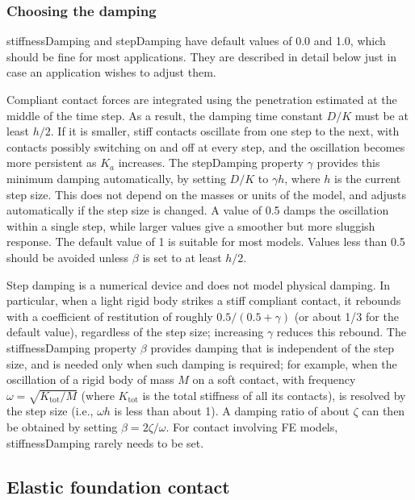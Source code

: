 \subsubsection{Choosing the damping}
\label{AreaCompliantContactDamping:sec}

{\sf stiffnessDamping} and {\sf stepDamping} have default values of 0.0 and
1.0, which should be fine for most applications. They are described in detail
below just in case an application wishes to adjust them.

Compliant contact forces are integrated using the penetration
estimated at the middle of the time step. As a result, the damping
time constant $D/K$ must be at least $h/2$. If it is smaller, stiff
contacts oscillate from one step to the next, with contacts possibly
switching on and off at every step, and the oscillation becomes more
persistent as $K_a$ increases. The {\sf stepDamping} property $\gamma$
provides this minimum damping automatically, by setting $D/K$ to
$\gamma h$, where $h$ is the current step size. This does not depend
on the masses or units of the model, and adjusts automatically if the
step size is changed. A value of 0.5 damps the oscillation within a
single step, while larger values give a smoother but more sluggish
response. The default value of 1 is suitable for most models. Values
less than 0.5 should be avoided unless $\beta$ is set to at least
$h/2$.

Step damping is a numerical device and does not model physical
damping. In particular, when a light rigid body strikes a stiff
compliant contact, it rebounds with a coefficient of restitution of
roughly $0.5/(0.5+\gamma)$ (or about 1/3 for the default value),
regardless of the step size; increasing $\gamma$ reduces this
rebound. The {\sf stiffnessDamping} property $\beta$ provides damping
that is independent of the step size, and is needed only when such
damping is required; for example, when the oscillation of a rigid body
of mass $M$ on a soft contact, with frequency $\omega =
\sqrt{K_{\text{tot}}/M}$ (where $K_{\text{tot}}$ is the total
stiffness of all its contacts), is resolved by the step size (i.e., $\omega h$
is less than about 1). A damping ratio of about $\zeta$ can then be obtained by
setting $\beta = 2 \zeta/\omega$. For contact involving FE models, {\sf
stiffnessDamping} rarely needs to be set.

\subsection{Elastic foundation contact}
\label{ElasticFoundationContact:sec}

